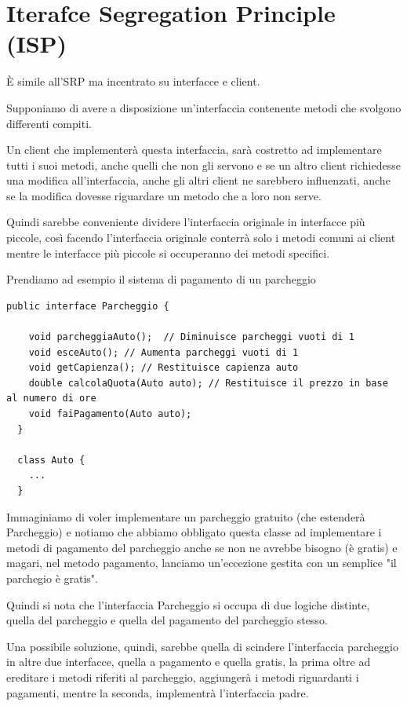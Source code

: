 \newpage
\section{Iterafce Segregation Principle (ISP)}

È simile all’SRP ma incentrato su interfacce e client.
\smallskip

Supponiamo di avere a disposizione un'interfaccia contenente metodi che svolgono differenti compiti.

Un client che implementerà questa interfaccia, sarà costretto ad implementare tutti i suoi metodi, anche quelli che non gli servono e se un altro client richiedesse una 
modifica all’interfaccia, anche gli altri client ne sarebbero influenzati, anche se la modifica dovesse riguardare un metodo che a loro non serve.

Quindi sarebbe conveniente dividere l'interfaccia originale in interfacce più piccole, così facendo l'interfaccia originale conterrà solo i metodi comuni ai client 
mentre le interfacce più piccole si occuperanno dei metodi specifici.
\smallskip

Prendiamo ad esempio il sistema di pagamento di un parcheggio

\begin{lstlisting}[linewidth=15cm]
  public interface Parcheggio {

    void parcheggiaAuto();	// Diminuisce parcheggi vuoti di 1
    void esceAuto(); // Aumenta parcheggi vuoti di 1
    void getCapienza();	// Restituisce capienza auto
    double calcolaQuota(Auto auto); // Restituisce il prezzo in base al numero di ore
    void faiPagamento(Auto auto);
  }

  class Auto {
    ...
  }
\end{lstlisting}

Immaginiamo di voler implementare un parcheggio gratuito (che estenderà Parcheggio) e notiamo che abbiamo obbligato questa classe ad implementare i metodi di pagamento
del parcheggio anche se non ne avrebbe bisogno (è gratis) e magari, nel metodo pagamento, lanciamo un'eccezione gestita con un semplice "il parchegio è gratis".

Quindi si nota che l'interfaccia Parcheggio si occupa di due logiche distinte, quella del parcheggio e quella del pagamento del parcheggio stesso.

Una possibile soluzione, quindi, sarebbe quella di scindere l'interfaccia parcheggio in altre due interfacce, quella a pagamento e quella gratis, la prima oltre 
ad ereditare i metodi riferiti al parcheggio, aggiungerà i metodi riguardanti i pagamenti, mentre la seconda, implementrà l'interfaccia padre.

